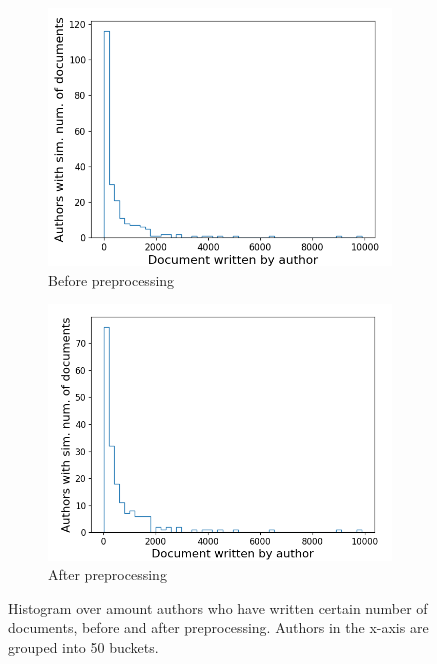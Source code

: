 \begin{figure}[ht]
	\centering
	\begin{subfigure}{0.45\textwidth}
		\centering
		\includegraphics[width=\linewidth]{figures/author_hist2_before.png}
		\caption{Before preprocessing}
		\label{fig:author_hist_before}
	\end{subfigure}
	\begin{subfigure}{0.45\textwidth}
		\centering
		\includegraphics[width=\linewidth]{figures/author_hist2_14.png}
		\caption{After preprocessing}
		\label{fig:auhtor_hist_after}
	\end{subfigure}
	\caption{Histogram over amount authors who have written certain number of documents, before and after preprocessing. Authors in the x-axis are grouped into 50 buckets.}
	\label{fig:author_hist}
\end{figure}

